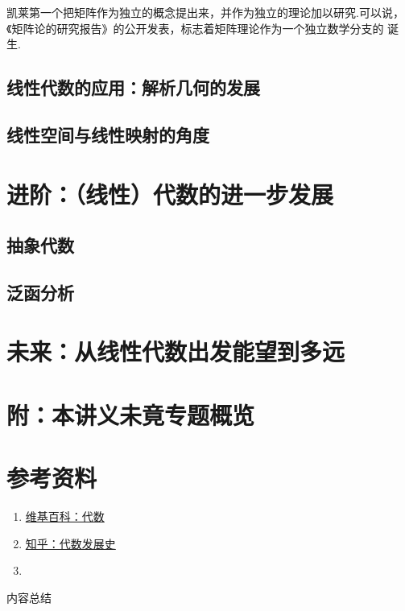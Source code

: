 凯莱第一个把矩阵作为独立的概念提出来，并作为独立的理论加以研究.可以说，《矩阵论的研究报告》的公开发表，标志着矩阵理论作为一个独立数学分支的
诞生.

\subsection{线性代数的应用：解析几何的发展}


\subsection{线性空间与线性映射的角度}


\section{进阶：（线性）代数的进一步发展}
\subsection{抽象代数}


\subsection{泛函分析}


\section{未来：从线性代数出发能望到多远}


\section*{附：本讲义未竟专题概览}


\section*{参考资料}
\begin{enumerate}
    \item \href{https://zh.wikipedia.org/wiki/%E4%BB%A3%E6%95%B0}{维基百科：代数}
    \item \href{https://zhuanlan.zhihu.com/p/574858845}{知乎：代数发展史}
    \item 
\end{enumerate}
\vspace{2ex}
\centerline{\heiti \Large 内容总结}

\vspace{2ex}

